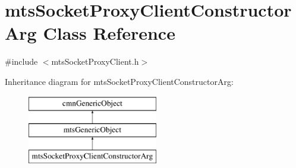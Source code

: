 \hypertarget{classmts_socket_proxy_client_constructor_arg}{\section{mts\-Socket\-Proxy\-Client\-Constructor\-Arg Class Reference}
\label{classmts_socket_proxy_client_constructor_arg}
}


{\ttfamily \#include $<$mts\-Socket\-Proxy\-Client.\-h$>$}

Inheritance diagram for mts\-Socket\-Proxy\-Client\-Constructor\-Arg\-:\begin{figure}[H]
\begin{center}
\leavevmode
\includegraphics[height=3.000000cm]{d2/dca/classmts_socket_proxy_client_constructor_arg}
\end{center}
\end{figure}
